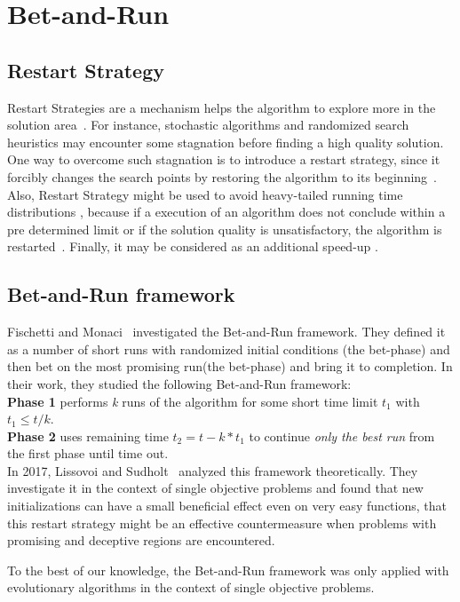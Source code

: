 \section{Bet-and-Run}\label{intro}

\subsection{Restart Strategy}
Restart Strategies are a mechanism helps the algorithm to explore more in the solution area~\cite{yu2018simulated}. For instance, stochastic algorithms and randomized search heuristics may encounter some stagnation before finding a high quality solution. One way to overcome  such stagnation is to introduce a restart strategy, since it forcibly changes the search points by restoring the algorithm to its beginning~\cite{kanahara2018restart}. Also, Restart Strategy might be used to avoid heavy-tailed running time distributions \cite{gomes2000heavy}, because if a execution of an algorithm does not conclude within a pre determined limit or if the solution quality is unsatisfactory, the algorithm is restarted~\cite{lissovoi2017theoretical}. Finally, it may be considered as an additional speed-up \cite{friedrich2017generic}.

\subsection{Bet-and-Run framework}


Fischetti and Monaci~\cite{fischetti2014exploiting} investigated the Bet-and-Run framework. They defined it as a number of short runs with randomized initial conditions (the bet-phase) and then bet on the most promising run(the bet-phase) and bring it to completion. In their work, they studied the following Bet-and-Run framework:\\


\indent \textbf{Phase 1} performs \textit{k} runs of the algorithm for some short time limit \textit{$t_1$} with $t_1 \leq t/k$.\\
\indent \textbf{Phase 2} uses remaining time $t_2 = t - k*t_1$ to continue \textit{only the best run} from the first phase until time out. \\

In 2017, Lissovoi and Sudholt~\cite{lissovoi2017theoretical} analyzed this framework theoretically. They investigate it in the context of single objective problems and found that new initializations can have a small beneficial effect even on very easy functions, that this restart strategy might be an effective countermeasure when problems with promising and deceptive regions are encountered.


To the best of our knowledge, the Bet-and-Run framework was only applied with evolutionary algorithms in the context of single objective problems. 

